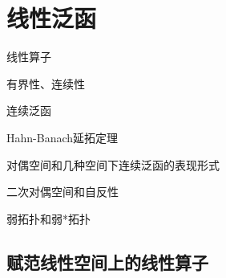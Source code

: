 \documentclass[lang=cn,10pt]{elegantbook}
\begin{document}
		\chapter{线性泛函}
	\begin{introduction}
		\item 线性算子
		\item 有界性、连续性
		\item 连续泛函
		\item Hahn-Banach延拓定理
		\item 对偶空间和几种空间下连续泛函的表现形式
		\item 二次对偶空间和自反性
		\item 弱拓扑和弱*拓扑
	\end{introduction}
	\section{赋范线性空间上的线性算子}
\end{document}
